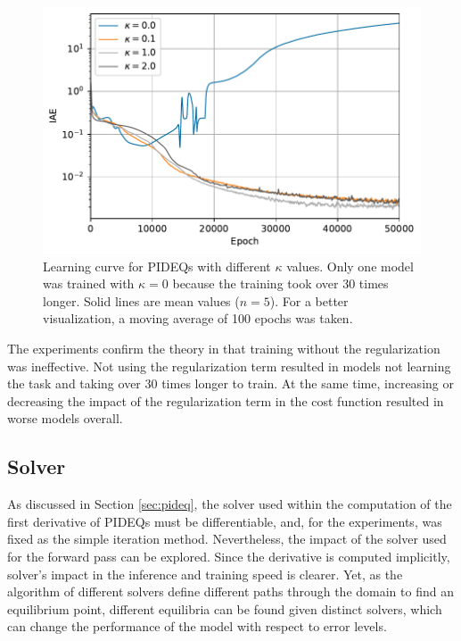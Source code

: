 \begin{figure}[h]
    \centering
    \includegraphics{images/exp_4_iae.pdf}
    \caption[Learning curve for \gls{PIDEQ}s with different $\kappa$ values.]{Learning curve for \gls{PIDEQ}s with different $\kappa$ values. Only one model was trained with $\kappa=0$ because the training took over 30 times longer. Solid lines are mean values ($n=5$). For a better visualization, a moving average of 100 epochs was taken.}
    \label{fig:jac-lamb-iae}
\end{figure}

The experiments confirm the theory in that training without the regularization was ineffective.
Not using the regularization term resulted in models not learning the task and taking over 30 times longer to train.
At the same time, increasing or decreasing the impact of the regularization term in the cost function resulted in worse models overall.

\subsection{Solver}

As discussed in Section \ref{sec:pideq}, the solver used within the computation of the first derivative of \glspl{PIDEQ} must be differentiable, and, for the experiments, was fixed as the simple iteration method.
Nevertheless, the impact of the solver used for the forward pass can be explored.
Since the derivative is computed implicitly, solver's impact in the inference and training speed is clearer.
Yet, as the algorithm of different solvers define different paths through the domain to find an equilibrium point, different equilibria can be found given distinct solvers, which can change the performance of the model with respect to error levels. 

